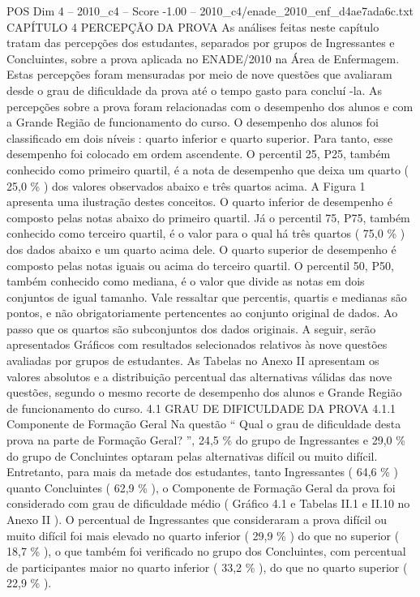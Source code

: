 \begin{textsample}{POS Dim 4 – 2010\_c4 – Score -1.00 – 2010\_c4/enade\_2010\_enf\_d4ae7ada6c.txt}  \label{ex:f4_pos_289}
CAPÍTULO 4 PERCEPÇÃO DA PROVA As análises feitas neste capítulo tratam das percepções dos estudantes, separados por grupos de Ingressantes e Concluintes, sobre a prova aplicada no ENADE/2010 na Área de Enfermagem.
Estas percepções foram mensuradas por meio de nove questões que avaliaram desde o grau de dificuldade da prova até o tempo gasto para concluí -la.
As percepções sobre a prova foram relacionadas com o desempenho dos alunos e com a Grande Região de funcionamento do curso.
O desempenho dos alunos foi classificado em dois níveis : quarto inferior e quarto superior.
Para tanto, esse desempenho foi colocado em ordem ascendente.
O percentil 25, P25, também conhecido como primeiro quartil, é a nota de desempenho que deixa um quarto ( 25,0 \% ) dos valores observados abaixo e três quartos acima.
A Figura 1 apresenta uma ilustração destes conceitos.
O quarto inferior de desempenho é composto pelas notas abaixo do primeiro quartil.
Já o percentil 75, P75, também conhecido como terceiro quartil, é o valor para o qual há três quartos ( 75,0 \% ) dos dados abaixo e um quarto acima dele.
O quarto superior de desempenho é composto pelas notas iguais ou acima do terceiro quartil.
O percentil 50, P50, também conhecido como mediana, é o valor que divide as notas em dois conjuntos de igual tamanho.
Vale ressaltar que percentis, quartis e medianas são pontos, e não obrigatoriamente pertencentes ao conjunto original de dados.
Ao passo que os quartos são subconjuntos dos dados originais.
A seguir, serão apresentados Gráficos com resultados selecionados relativos às nove questões avaliadas por grupos de estudantes.
As Tabelas no Anexo II apresentam os valores absolutos e a distribuição percentual das alternativas válidas das nove questões, segundo o mesmo recorte de desempenho dos alunos e Grande Região de funcionamento do curso. 4.1 GRAU DE DIFICULDADE DA PROVA 4.1.1 Componente de Formação Geral Na questão “ Qual o grau de dificuldade desta prova na parte de Formação Geral? ”, 24,5 \% do grupo de Ingressantes e 29,0 \% do grupo de Concluintes optaram pelas alternativas difícil ou muito difícil.
Entretanto, para mais da metade dos estudantes, tanto Ingressantes ( 64,6 \% ) quanto Concluintes ( 62,9 \% ), o Componente de Formação Geral da prova foi considerado com grau de dificuldade médio ( Gráfico 4.1 e Tabelas II.1 e II.10 no Anexo II ).
O percentual de Ingressantes que consideraram a prova difícil ou muito difícil foi mais elevado no quarto inferior ( 29,9 \% ) do que no superior ( 18,7 \% ), o que também foi verificado no grupo dos Concluintes, com percentual de participantes maior no quarto inferior ( 33,2 \% ), do que no quarto superior ( 22,9 \% ).

\end{textsample}

